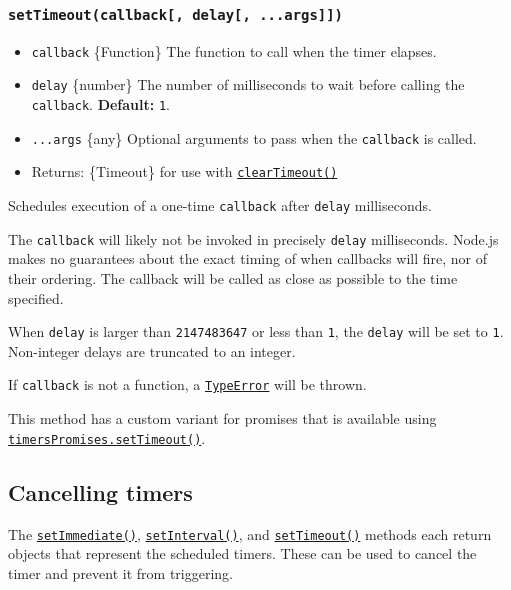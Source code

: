 \subsubsection{\texorpdfstring{\texttt{setTimeout(callback{[},\ delay{[},\ ...args{]}{]})}}{setTimeout(callback{[}, delay{[}, ...args{]}{]})}}\label{settimeoutcallback-delay-...args}

\begin{itemize}
\tightlist
\item
  \texttt{callback} \{Function\} The function to call when the timer
  elapses.
\item
  \texttt{delay} \{number\} The number of milliseconds to wait before
  calling the \texttt{callback}. \textbf{Default:} \texttt{1}.
\item
  \texttt{...args} \{any\} Optional arguments to pass when the
  \texttt{callback} is called.
\item
  Returns: \{Timeout\} for use with
  \hyperref[cleartimeouttimeout]{\texttt{clearTimeout()}}
\end{itemize}

Schedules execution of a one-time \texttt{callback} after \texttt{delay}
milliseconds.

The \texttt{callback} will likely not be invoked in precisely
\texttt{delay} milliseconds. Node.js makes no guarantees about the exact
timing of when callbacks will fire, nor of their ordering. The callback
will be called as close as possible to the time specified.

When \texttt{delay} is larger than \texttt{2147483647} or less than
\texttt{1}, the \texttt{delay} will be set to \texttt{1}. Non-integer
delays are truncated to an integer.

If \texttt{callback} is not a function, a
\href{errors.md\#class-typeerror}{\texttt{TypeError}} will be thrown.

This method has a custom variant for promises that is available using
\hyperref[timerspromisessettimeoutdelay-value-options]{\texttt{timersPromises.setTimeout()}}.

\subsection{Cancelling timers}\label{cancelling-timers}

The \hyperref[setimmediatecallback-args]{\texttt{setImmediate()}},
\hyperref[setintervalcallback-delay-args]{\texttt{setInterval()}}, and
\hyperref[settimeoutcallback-delay-args]{\texttt{setTimeout()}} methods
each return objects that represent the scheduled timers. These can be
used to cancel the timer and prevent it from triggering.

